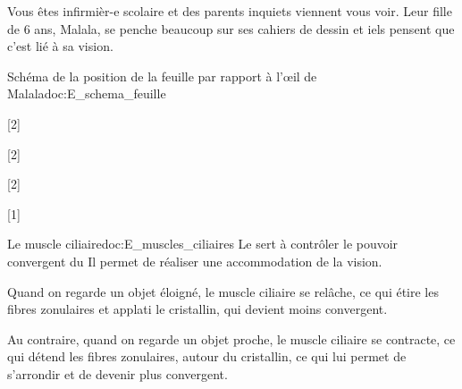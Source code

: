 
Vous êtes infirmièr-e scolaire et des parents inquiets viennent vous voir. Leur fille de 6 ans, Malala, se penche beaucoup sur ses cahiers de dessin et iels pensent que c'est lié à sa vision.


\begin{doc}{Schéma de la position de la feuille par rapport à l’œil de Malala}{doc:E_schema_feuille}
  \centering
\end{doc}

[2]


[2]

[2]

\pasCorrection{
  \newpage
  \vspace*{-24pt}
}
[1]


\begin{doc}{Le muscle ciliaire}{doc:E_muscles_ciliaires}
  Le  sert à contrôler le pouvoir convergent du 
  Il permet de réaliser une accommodation de la vision.

  Quand on regarde un objet éloigné, le muscle ciliaire se relâche, ce qui étire les fibres zonulaires et applati le cristallin, qui devient moins convergent.

  Au contraire, quand on regarde un objet proche, le muscle ciliaire se contracte, ce qui détend les fibres zonulaires, autour du cristallin, ce qui lui permet de s'arrondir et de devenir plus convergent.
\end{doc}

